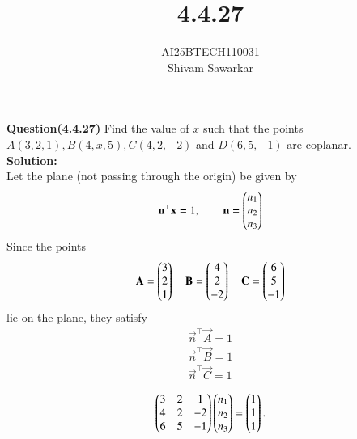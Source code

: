 \documentclass[journal]{IEEEtran}
\begin{document}

\vspace{3cm}

\title{4.4.27}
\author{AI25BTECH110031 \\ Shivam Sawarkar}
 \maketitle
{\let\newpage\relax\maketitle}

\renewcommand{\thefigure}{\theenumi}
\renewcommand{\thetable}{\theenumi}
\setlength{\intextsep}{10pt} %


\renewcommand{\thetable}{\theenumi}

\textbf{Question(4.4.27)} Find the value of $x$ such that the points $A (3, 2, 1) , B (4, x, 5) , C (4, 2, -2)$ and $D (6, 5, -1)$ are coplanar. \\ 
\textbf{Solution:} \\ 
Let the plane (not passing through the origin) be given by
\begin{align}
\mathbf{n}^\top\mathbf{x}=1,\qquad 
\mathbf{n}=\begin{pmatrix}n_1 \\ n_2 \\ n_3\end{pmatrix}
\end{align}
Since the points 
\begin{align}
    \mathbf{A}=\begin{pmatrix}3 \\ 2 \\ 1\end{pmatrix} \quad
    \mathbf{B}=\begin{pmatrix}4 \\ 2 \\ -2\end{pmatrix} \quad
    \mathbf{C}=\begin{pmatrix}6 \\ 5 \\ -1\end{pmatrix}
\end{align}
lie on the plane, they satisfy 
\begin{align}
    \vec{n}^\top\vec{A}=1 \\ 
    \vec{n}^\top\vec{B}=1 \\ 
    \vec{n}^\top\vec{C}=1
\end{align}

\begin{align}
\begin{pmatrix}
3 & 2 & 1\\ 
4 & 2 & -2\\ 
6 & 5 & -1
\end{pmatrix}
\begin{pmatrix}n_1\\ n_2\\ n_3\end{pmatrix}
=
\begin{pmatrix}1 \\ 1 \\ 1\end{pmatrix}.
\end{align}
\end{document}
